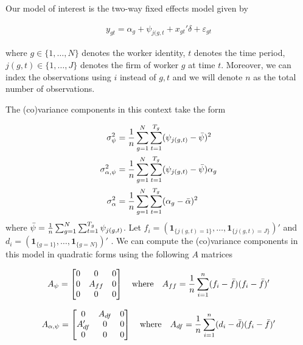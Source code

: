 \documentclass[12pt]{article}
\begin{document}
\vspace{0.5cm}
Our model of interest is the two-way fixed effects model given by

\begin{align*}
y_{gt} = \alpha_{g} + \psi_{j(g,t} + x_{gt}' \delta + \varepsilon_{gt}
\end{align*}


\noindent where $g \in \{1,\dots,N\}$ denotes the worker identity, $t$ denotes the time period, $j(g,t) \in \{1,\dots,J\}$ denotes the firm of worker $g$ at time $t$. Moreover, we can index the observations using $i$ instead of $g,t$ and we will denote $n$ as the total number of observations. 

The (co)variance components in this context take the form 

\begin{align*}
    \sigma_{\psi}^2 &= \frac{1}{n} \sum_{g=1}^{N} \sum_{t=1}^{T_g} (\psi_{j(g,t)} - \Bar{\psi})^2  \\
    \sigma_{\alpha, \psi}^2 &= \frac{1}{n} \sum_{g=1}^{N} \sum_{t=1}^{T_g} (\psi_{j(g,t)} - \Bar{\psi}) \alpha_g  \\
    \sigma_{\alpha}^2 &= \frac{1}{n} \sum_{g=1}^{N} \sum_{t=1}^{T_g} (\alpha_{g} - \Bar{\alpha})^2   \\
\end{align*}
where $\Bar{\psi} = \frac{1}{n} \sum_{g=1}^{N} \sum_{t=1}^{T_g} \psi_{j(g,t)}$. Let $f_i = (\boldsymbol{1}_{\{j(g,t)=1\}},\dots,\boldsymbol{1}_{\{j(g,t)=J\}})'$ and $d_i = (\boldsymbol{1}_{\{g=1\}},\dots,\boldsymbol{1}_{\{g=N\}})'$ . We can compute the (co)variance components in this model in quadratic forms using the following $A$ matrices

\begin{align*}
A_{\psi} = \begin{bmatrix}
0 & 0 & 0\\
0 & A_{ff} & 0\\
0 & 0 & 0
\end{bmatrix} \quad \text{where} \quad A_{ff} = \frac{1}{n} \sum_{i=1}^n (f_i - \Bar{f})(f_i - \Bar{f})'
\end{align*}

\begin{align*}
A_{\alpha,\psi} = \begin{bmatrix}
0 & A_{df} & 0\\
A_{df}' & 0 & 0\\
0 & 0 & 0
\end{bmatrix} \quad \text{where} \quad A_{df} = \frac{1}{n} \sum_{i=1}^n (d_i - \Bar{d})(f_i - \Bar{f})'
\end{align*}
\end{document}

